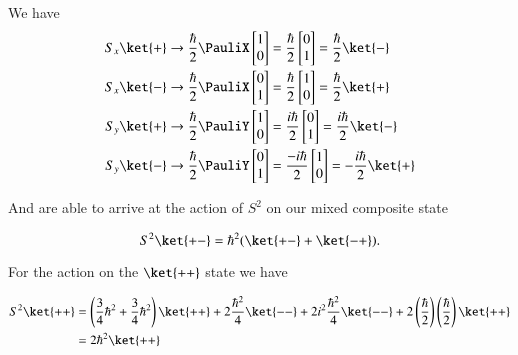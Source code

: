 We have
\begin{align*}
S_x\ket{+} 
&\rightarrow 
\frac{\hbar}{2} \PauliX
\begin{bmatrix}
1 \\
0
\end{bmatrix} 
=
\frac{\hbar}{2}
\begin{bmatrix}
0 \\
1 
\end{bmatrix}
=
\frac{\hbar}{2} \ket{-} \\
S_x\ket{-} &\rightarrow 
\frac{\hbar}{2} \PauliX
\begin{bmatrix}
0 \\
1 
\end{bmatrix} 
=
\frac{\hbar}{2}
\begin{bmatrix}
1  \\
0 
\end{bmatrix}
=
\frac{\hbar}{2} \ket{+} \\
S_y\ket{+} &\rightarrow 
\frac{\hbar}{2} \PauliY
\begin{bmatrix}
1  \\
0 
\end{bmatrix} 
=
\frac{i\hbar}{2}
\begin{bmatrix}
0  \\
1 
\end{bmatrix}
=
\frac{i\hbar}{2} \ket{-} \\
S_y\ket{-} &\rightarrow 
\frac{\hbar}{2} \PauliY
\begin{bmatrix}
0  \\
1 
\end{bmatrix} 
=
\frac{-i\hbar}{2}
\begin{bmatrix}
1  \\
0 
\end{bmatrix}
=
-\frac{i\hbar}{2} \ket{+} \\
\end{align*}

And are able to arrive at the action of $S^2$ on our mixed composite state

\begin{equation}\label{eqn:qmTwoL16:430}
S^2\ket{+-} = \hbar^2 (\ket{+-} + \ket{-+} ).
\end{equation}

For the action on the $\ket{++}$ state we have

\begin{align*}
S^2 \ket{++} 
&=
\left(\frac{3}{4}\hbar^2 +\frac{3}{4}\hbar^2\right)
\ket{++} 
+ 2 \frac{\hbar^2}{4} 
\ket{--} 
+ 2 i^2 \frac{\hbar^2}{4} \ket{--} 
+2 
\left(\frac{\hbar}{2}\right)
\left(\frac{\hbar}{2}\right)
\ket{++} \\
&=
2 \hbar^2 \ket{++} \\
\end{align*}


